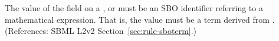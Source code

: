 The value of the  field on a \AlgebraicRule, \RateRule or
\AssignmentRule must be an SBO identifier referring to a mathematical
expression.  That is, the value must be a term derived from
\sbomathformula.  (References: SBML L2v2
Section~\ref{sec:rule-sboterm}.)
